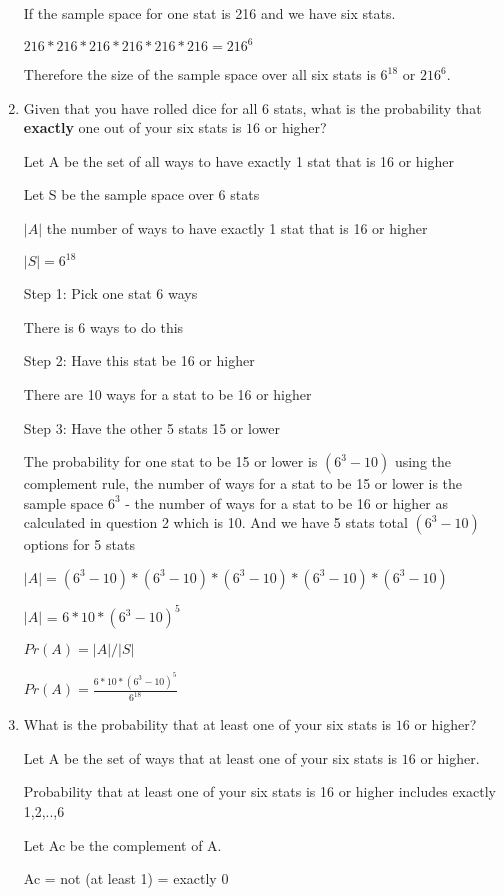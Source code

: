 \documentclass[12pt]{article}
\newcounter{ques}
\newenvironment{question}{\stepcounter{ques}{\noindent\bf Question \arabic{ques}:}}{\vspace{5mm}}
\begin{document}
\begin{question}
\begin{enumerate}
		If the sample space for one stat is 216 and we have six stats.

		$216 * 216 * 216 * 216 * 216 * 216 = 216^6$

		Therefore the size of the sample space over all six stats is $6^{18}$ or $216^6$.
			
		\item Given that you have rolled dice for all $6$ stats, what is the probability that \textbf{exactly} one out of your six stats is $16$ or higher?
		

		Let A be the set of all ways to have exactly 1 stat that is 16 or higher

		Let S be the sample space over 6 stats

		$|A|$ the number of ways to have exactly 1 stat that is 16 or higher

		$|S| = 6^{18}$

		Step 1: Pick one stat 6 ways

		There is 6 ways to do this

		Step 2: Have this stat be 16 or higher

		There are 10 ways for a stat to be 16 or higher

		Step 3: Have the other 5 stats 15 or lower

		The probability for one stat to be 15 or lower is $(6^3 - 10)$ using the complement rule,
		the number of ways for a stat to be 15 or lower is the sample space $6^3$ - the number of ways
		for a stat to be 16 or higher as calculated in question 2 which is 10. 
		And we have 5 stats total $(6^3 - 10)$ options for 5 stats
	
		$|A| = (6^3 - 10) * (6^3 - 10) * (6^3 - 10)* (6^3 - 10)* (6^3 - 10)$

		$|A|$ = $6 * 10 * (6^3 - 10)^5$

		$Pr(A) = |A|/|S|$

		$Pr(A) = \frac{6 * 10 * (6^3 - 10)^5}{6^{18}}$

		\item What is the probability that at least one of your six stats is $16$ or higher?
		
		Let A be the set of ways that at least one of your six stats is $16$ or higher.

		Probability that at least one of your six stats is 16 or higher includes exactly 1,2,..,6

		Let Ac be the complement of A.

		Ac = not (at least 1) = exactly 0


\end{enumerate}
\end{question}
\end{document}
